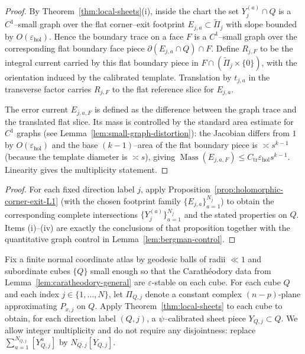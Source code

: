 \documentclass[11pt]{article}
\numberwithin{equation}{section}  %
\theoremstyle{plain}
\theoremstyle{definition}
\theoremstyle{remark}
\DeclareMathOperator{\Mass}{Mass}
\begin{document}
\begin{proof}
By Theorem~\ref{thm:local-sheets}(i), inside the chart the set $Y_{j}^{(a)}\cap Q$ is a $C^1$--small graph
over the flat corner--exit footprint $E_{j,a}\subset \widetilde\Pi_j$ with slope bounded by $O(\varepsilon_{\mathrm{hol}})$.
Hence the boundary trace on a face $F$ is a $C^1$--small graph over the corresponding flat boundary face piece
$\partial(E_{j,a}\cap Q)\cap F$.  Define $R_{j,F}$ to be the integral current carried by this flat boundary piece
in $F\cap(\widetilde\Pi_j\times\{0\})$, with the orientation induced by the calibrated template.
Translation by $t_{j,a}$ in the transverse factor carries $R_{j,F}$ to the flat reference slice for $E_{j,a}$.

The error current $E_{j,a,F}$ is defined as the difference between the graph trace and the translated flat slice.
Its mass is controlled by the standard area estimate for $C^1$ graphs (see Lemma~\ref{lem:small-graph-distortion}):
the Jacobian differs from $1$ by $O(\varepsilon_{\mathrm{hol}})$ and the base $(k\!-\!1)$--area of the flat boundary
piece is $\asymp s^{k-1}$ (because the template diameter is $\asymp s$), giving
$\Mass(E_{j,a,F})\le C_{\mathrm{tr}}\varepsilon_{\mathrm{hol}}s^{k-1}$.
Linearity gives the multiplicity statement.
\end{proof}




\begin{proof}
For each fixed direction label $j$, apply Proposition~\ref{prop:holomorphic-corner-exit-L1}
(with the chosen footprint family $\{E_{j,a}\}_{a=1}^{N_j}$) to obtain the corresponding complete intersections
$\{Y_{j}^{(a)}\}_{a=1}^{N_j}$ and the stated properties on $Q$.
Items (i)--(iv) are exactly the conclusions of that proposition together with the quantitative graph control in
Lemma~\ref{lem:bergman-control}.
\end{proof}
\endgroup


Fix a finite normal coordinate atlas by geodesic balls of radii $\ll 1$
and subordinate cubes $\{Q\}$ small enough so that the Carath\'eodory
data from Lemma~\ref{lem:caratheodory-general} are $\varepsilon$-stable
on each cube.  For each cube $Q$ and each index $j\in\{1,\ldots,N\}$,
let $\Pi_{Q,j}$ denote a constant complex $(n-p)$-plane approximating
$P_{x,j}$ on $Q$.  {Apply Theorem~\ref{thm:local-sheets} to each cube to obtain, for each direction label $(Q,j)$, a $\psi$--calibrated sheet piece $Y_{Q,j}\subset Q$.
We allow integer multiplicity and do not require any disjointness: replace $\sum_{a=1}^{N_{Q,j}}[Y_{Q,j}^a]$ by $N_{Q,j}[Y_{Q,j}]$.}
\end{document}
